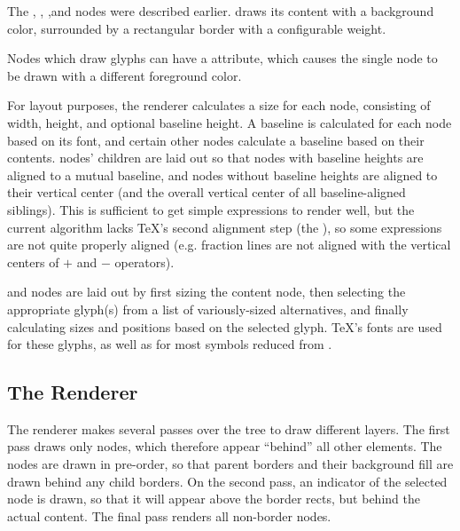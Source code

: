 The , , ,and  nodes were described earlier.  draws its content with a background color, surrounded by a rectangular border with a configurable weight.

Nodes which draw glyphs can have a  attribute, which causes the single node to be drawn with a different foreground color.

For layout purposes, the renderer calculates a size for each node, consisting of width, height, and optional baseline height. A baseline is calculated for each  node based on its font, and certain other nodes calculate a baseline based on their contents.  nodes' children are laid out so that nodes with baseline heights are aligned to a mutual baseline, and nodes without baseline heights are aligned to their vertical center (and the overall vertical center of all baseline-aligned siblings). This is sufficient to get simple expressions to render well, but the current algorithm lacks \TeX's second alignment step (the ), so some expressions are not quite properly aligned (e.g. fraction lines are not aligned with the vertical centers of $+$ and $-$ operators).
 
 and  nodes are laid out by first sizing the content node, then selecting the appropriate glyph(s) from a list of variously-sized alternatives, and finally calculating sizes and positions based on the selected glyph. \TeX's fonts are used for these glyphs, as well as for most symbols reduced from . 


\subsection{The Renderer}

The renderer makes several passes over the tree to draw different layers. The first pass draws only  nodes, which therefore appear ``behind'' all other elements. The nodes are drawn in pre-order, so that parent borders and their background fill are drawn behind any child borders. On the second pass, an indicator of the selected node is drawn, so that it will appear above the border rects, but behind the actual content. The final pass renders all non-border nodes.  

